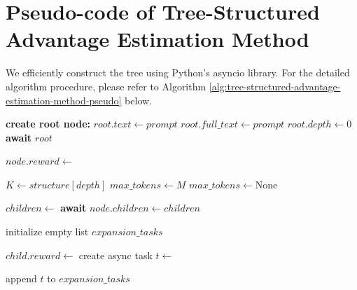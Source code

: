 \section{Pseudo-code of Tree-Structured Advantage Estimation Method}
\label{appendix:pseudo-code-of-tree-structured-advantage-estimation-method}

We efficiently construct the tree using Python's asyncio library. For the detailed algorithm procedure, please refer to  Algorithm \ref{alg:tree-structured-advantage-estimation-method-pseudo} below.  

\begin{algorithm}[htbp]
  \caption{Tree-structured Advantage Estimation Method}
  \label{alg:tree-structured-advantage-estimation-method-pseudo}
  \begin{algorithmic}[1]   %
  
      \State \textbf{create root node:}
        \State\hspace{\algorithmicindent} $root.text \leftarrow prompt$
        \State\hspace{\algorithmicindent} $root.full\_text \leftarrow prompt$
        \State\hspace{\algorithmicindent} $root.depth \leftarrow 0$
      \State \textbf{await} 
      \State {}
      \State \Return $root$
    \EndProcedure

        \State $node.reward \leftarrow$ 
        \State \Return
      \EndIf

      \State $K \leftarrow structure[depth]$
        \State $max\_tokens \leftarrow M$
      \Else
        \State $max\_tokens \leftarrow \text{None}$
      \EndIf

      \State $children \leftarrow$ \textbf{await} 
      \State $node.children \leftarrow children$

      \State initialize empty list $expansion\_tasks$      

          \State $child.reward \leftarrow$ 
        \Else
            \State create async task $t \leftarrow$ \parbox[t]{0.8\linewidth}{%
            }
            \State append $t$ to $expansion\_tasks$
        \EndIf
      \EndFor


\end{algorithmic}
\end{algorithm}
